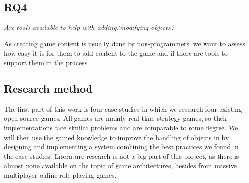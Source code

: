 \subsection{RQ4}
\textit{Are tools available to help with adding/modifying objects?}

As creating game content is usually done by non-programmers, we want to assess how easy it is for them to add content to
the game and if there are tools to support them in the process.

\subsection{Research method}
The first part of this work is four case studies in which we research four existing open source games. All games are
mainly real-time strategy games, so their implementations face similar problems and are comparable to some degree. We
will then use the gained knowledge to improve the handling of objects in \UH{} by designing and
implementing a system combining the best practices we found in the case studies. Literature research is not a big part
of this project, as there is almost none available on the topic of game architectures, besides from massive
multiplayer online role playing games.
